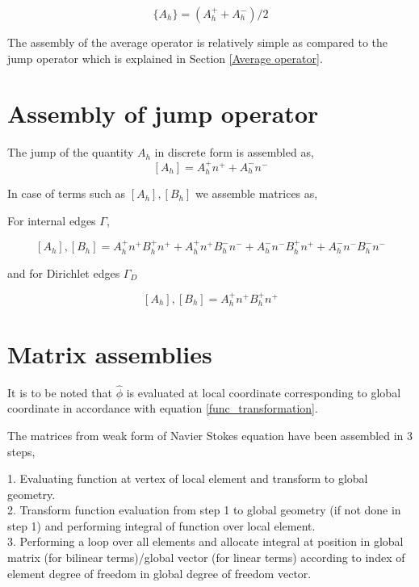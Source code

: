 \documentclass[a4paper]{book}
\begin{document}
\begin{equation}\label{Average operator}
\lbrace A_h \rbrace = (A_h^+ + A_h^-)/2
\end{equation}

The assembly of the average operator is relatively simple as compared to the jump operator which is explained in Section \ref{Average operator}.

\section{Assembly of jump operator} \label{Jump operator}

The jump of the quantity $A_h$ in discrete form is assembled as,
\begin{equation} \label{Jump_operator}
[A_h] = A_h^+ n^+ + A_h^- n^-
\end{equation}

In case of terms such as $[A_h],[B_h]$ we assemble matrices as, 

For internal edges $\Gamma$,

\begin{equation} \label{Jump operator L2}
[A_h],[B_h] = A_h^+ n^+ B_h^+ n^+ + A_h^+ n^+ B_h^- n^- + A_h^- n^- B_h^+ n^+ + A_h^- n^- B_h^- n^-
\end{equation}

and for Dirichlet edges $\Gamma_D$

\begin{equation} \label{Jump operator L2 for dirichlet}
[A_h],[B_h] = A_h^+ n^+ B_h^+ n^+ 
\end{equation}


\section{Matrix assemblies} \label{matrix_assembly_ch4}

It is to be noted that $\hat{\phi}$ is evaluated at local coordinate corresponding to global coordinate in accordance with equation \ref{func_transformation}.

The matrices from weak form of Navier Stokes equation have been assembled in 3 steps,

1. Evaluating function at vertex of local element and transform to global geometry.\\
2. Transform function evaluation from step 1 to global geometry (if not done in step 1) and performing integral of function over local element.\\
3. Performing a loop over all elements and allocate integral at position in global matrix (for bilinear terms)/global vector (for linear terms) according to index of element degree of freedom in global degree of freedom vector.\\
\end{document}
